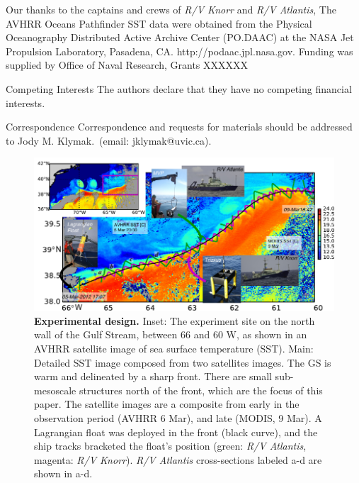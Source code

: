 \documentclass{natureJMK}
\begin{document}


\clearpage
\listoffigures
\clearpage

\begin{addendum}
 \item  Our thanks to the captains and crews of \emph{R/V Knorr} and \emph{R/V Atlantis}, The AVHRR Oceans Pathfinder SST data were obtained from the Physical Oceanography Distributed Active Archive Center (PO.DAAC) at the NASA Jet Propulsion Laboratory, Pasadena, CA. http://podaac.jpl.nasa.gov. Funding was supplied by Office of Naval Research, Grants XXXXXX
 \item[Competing Interests] The authors declare that they have no
competing financial interests.
 \item[Correspondence] Correspondence and requests for materials
should be addressed to Jody M. Klymak.~(email: jklymak@uvic.ca).
\end{addendum}
\clearpage

\begin{figure}[htbp]
  \centering
    \includegraphics[width=\textwidth]{./SatOverviewSecDTry2.pdf}
   \caption{{\bf Experimental design.}  Inset: The experiment site on the north wall of the Gulf Stream, between 66 and 60 W, as shown in an AVHRR satellite image of sea surface temperature (SST).  Main:  Detailed SST image composed from two satellites images.    The GS is warm and delineated by a sharp front.  There are small sub-mesoscale structures north of the front, which are the focus of this paper.  The satellite images are a composite from early in the observation period (AVHRR 6 Mar), and late (MODIS, 9 Mar).  A Lagrangian float was deployed in the front (black curve), and the ship tracks bracketed the float's position (green: \emph{R/V Atlantis}, magenta: \emph{R/V Knorr}). \emph{R/V Atlantis} cross-sections labeled a-d are shown in a-d.  }\label{fig:SatOverviewSectD}
\end{figure}
\end{document}
